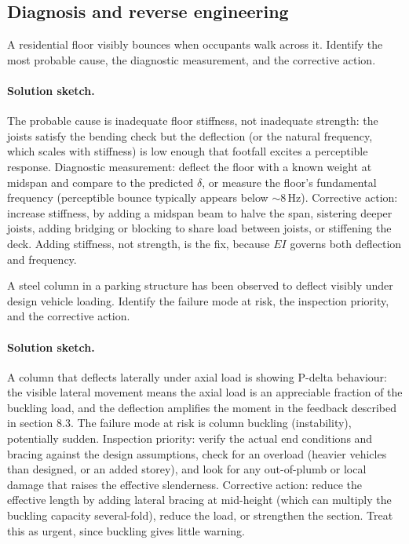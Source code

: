 \subsection*{Diagnosis and reverse engineering}

\begin{exercise}
A residential floor visibly bounces when occupants walk across it.
Identify the most probable cause, the diagnostic measurement, and
the corrective action.

\paragraph{Solution sketch.} The probable cause is inadequate floor
stiffness, not inadequate strength: the joists satisfy the bending
check but the deflection (or the natural frequency, which scales with
stiffness) is low enough that footfall excites a perceptible response.
Diagnostic measurement: deflect the floor with a known weight at
midspan and compare to the predicted $\delta$, or measure the floor's
fundamental frequency (perceptible bounce typically appears below
$\sim 8\,\text{Hz}$). Corrective action: increase stiffness, by adding
a midspan beam to halve the span, sistering deeper joists, adding
bridging or blocking to share load between joists, or stiffening the
deck. Adding stiffness, not strength, is the fix, because $EI$ governs
both deflection and frequency.
\end{exercise}

\begin{exercise}
A steel column in a parking structure has been observed to deflect
visibly under design vehicle loading. Identify the failure mode at
risk, the inspection priority, and the corrective action.

\paragraph{Solution sketch.} A column that deflects laterally under
axial load is showing P-delta behaviour: the visible lateral movement
means the axial load is an appreciable fraction of the buckling load,
and the deflection amplifies the moment in the feedback described in
section 8.3. The failure mode at risk is column buckling (instability),
potentially sudden. Inspection priority: verify the actual end
conditions and bracing against the design assumptions, check for an
overload (heavier vehicles than designed, or an added storey), and look
for any out-of-plumb or local damage that raises the effective
slenderness. Corrective action: reduce the effective length by adding
lateral bracing at mid-height (which can multiply the buckling capacity
several-fold), reduce the load, or strengthen the section. Treat this as
urgent, since buckling gives little warning.
\end{exercise}

